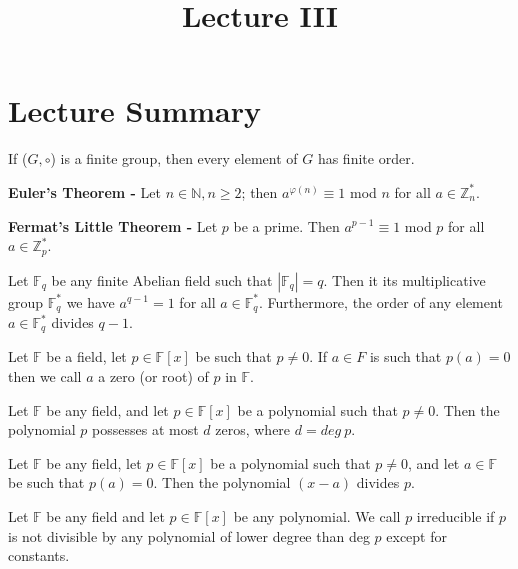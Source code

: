 \documentclass[a4paper]{article}
\title{\vspace{-2cm}Lecture III\vspace{-2cm}}
\date{}
\begin{document}
\maketitle
\section{Lecture Summary}
\begin{theorem}
If ($G, \circ$) is a finite group, then every element of $G$ has finite order.
\end{theorem}


\begin{theorem}
\textbf{Euler's Theorem -} Let $n \in \mathbb{N}, n \geq 2$; then $a^{\varphi(n)} \equiv 1$ mod $n$ for all $a \in \mathbb{Z}^{*}_{n}$.
\end{theorem}


\begin{theorem}
\textbf{Fermat's Little Theorem -} Let $p$ be a prime. Then $a^{p-1} \equiv 1$ mod $p$ for all $a \in \mathbb{Z}^{*}_{p}$.
\end{theorem}


\begin{theorem}
Let $\mathbb{F}_{q}$ be any finite Abelian field such that $|\mathbb{F}_{q}| = q$. Then it its multiplicative group $\mathbb{F}_{q}^{*}$ we have $a^{q - 1} = 1$ for all $a \in \mathbb{F}^{*}_{q}$. Furthermore, the order of any element $a \in \mathbb{F}^{*}_{q}$ divides $q - 1$.
\end{theorem}


\begin{definition}
Let $\mathbb{F}$ be a field, let $p \in \mathbb{F}[x]$ be such that $p \neq 0$. If $a \in F$ is such that $p(a) = 0$ then we call $a$ a zero (or root) of $p$ in $\mathbb{F}$.
\end{definition}


\begin{theorem}
Let $\mathbb{F}$ be any field, and let $p \in \mathbb{F}[x]$ be a polynomial such that $p \neq 0$. Then the polynomial $p$ possesses at most $d$ zeros, where $d = deg\ p$.
\end{theorem}


\begin{corollary}
Let $\mathbb{F}$ be any field, let $p \in \mathbb{F}[x]$ be a polynomial such that $p \neq 0$, and let $a \in \mathbb{F}$ be such that $p(a) = 0$. Then the polynomial $(x - a)$ divides $p$.
\end{corollary}

\begin{definition}
Let $\mathbb{F}$ be any field and let $p \in \mathbb{F}[x]$ be any polynomial. We call $p$ irreducible if $p$ is not divisible by any polynomial of lower degree than deg $p$ except for constants.
\end{definition}
\end{document}
